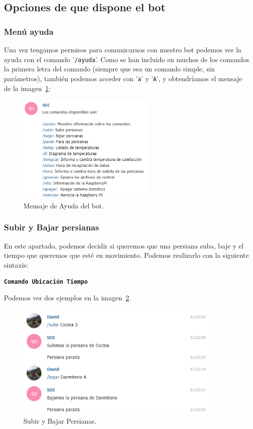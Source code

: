 \subsection{Opciones de que dispone el bot}

\subsubsection{Menú ayuda}
Una vez tengamos permisos para comunicarnos con nuestro bot podemos ver la ayuda con el comando '\texttt{/ayuda}'. Como se han incluido en muchos de los comandos la primera letra del comando (siempre que sea un comando simple, sin parámetros), también podemos acceder con '\texttt{a}' y '\texttt{A}', y obtendríamos el mensaje de la imagen~\ref{Bot:Ayuda}:

\begin{figure}[h]
\centering
\includegraphics[width=0.6\textwidth]{img/SalidasBot/mensajeAyuda.PNG}
\caption{Mensaje de Ayuda del bot.}\label{Bot:Ayuda}
\end{figure}

\subsubsection{Subir y Bajar persianas}
En este apartado, podemos decidir si queremos que una persiana suba, baje y el tiempo que queremos que esté en movimiento.
Podemos realizarlo con la siguiente sintaxis:

\texttt{\textbf{Comando Ubicación Tiempo}}  

Podemos ver dos ejemplos en la imagen~\ref{Bot:SubirBajar}.

\begin{figure}[h]
\centering
\includegraphics[width=0.9\textwidth]{img/SalidasBot/subirBajar.PNG}
\caption{Subir y Bajar Persianas.}\label{Bot:SubirBajar}
\end{figure}


